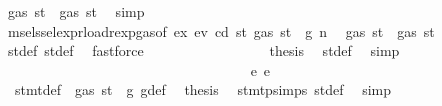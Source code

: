 \begin{isabellebody}
\ {\isachardoublequoteopen}gas\ st{}{\isacharprime}{\kern0pt}\ {\isasymle}\ gas\ st{\isacharprime}{\kern0pt}{\isacharprime}{\kern0pt}{\isachardoublequoteclose}\ \isamarkupfalse%
\ simp\isanewline
\ \ \ \ \ \ \ \ \ \ \ \ \ \ \isamarkupfalse%
\ \isamarkupfalse%
\ msel{\isacharunderscore}{\kern0pt}ssel{\isacharunderscore}{\kern0pt}expr{\isacharunderscore}{\kern0pt}load{\isacharunderscore}{\kern0pt}rexp{\isacharunderscore}{\kern0pt}gas{\isacharparenleft}{\kern0pt}{}{\isacharparenright}{\kern0pt}{\isacharbrackleft}{\kern0pt}of\ ex{\isacharprime}{\kern0pt}\ e\isactrlsub v\ cd\ st{\isacharprime}{\kern0pt}\ {\isachardoublequoteopen}gas\ st\ {\isacharminus}{\kern0pt}\ g{\isachardoublequoteclose}{\isacharbrackright}{\kern0pt}\ n\ \isamarkupfalse%
\ {\isachardoublequoteopen}gas\ st{\isacharprime}{\kern0pt}{\isacharprime}{\kern0pt}\ {\isasymle}\ gas\ st{\isacharprime}{\kern0pt}{\isachardoublequoteclose}\ \isamarkupfalse%
\ st{\isacharprime}{\kern0pt}{\isacharunderscore}{\kern0pt}def\ st{\isacharprime}{\kern0pt}{\isacharprime}{\kern0pt}{\isacharunderscore}{\kern0pt}def\ \isamarkupfalse%
\ fastforce\isanewline
\ \ \ \ \ \ \ \ \ \ \ \ \ \ \isamarkupfalse%
\ \isamarkupfalse%
\ {\isacharquery}{\kern0pt}thesis\ \isamarkupfalse%
\ st{\isacharprime}{\kern0pt}{\isacharunderscore}{\kern0pt}def\ \isamarkupfalse%
\ simp\isanewline
\ \ \ \ \ \ \ \ \ \ \ \ \isamarkupfalse%
\isanewline
\ \ \ \ \ \ \ \ \ \ \isamarkupfalse%
\isanewline
\ \ \ \ \ \ \ \ \isamarkupfalse%
\isanewline
\ \ \ \ \ \ \isamarkupfalse%
\isanewline
\ \ \ \ \ \ \ \ \isamarkupfalse%
\ {\isacharparenleft}{\kern0pt}e\ e{\isacharparenright}{\kern0pt}\isanewline
\ \ \ \ \ \ \ \ \isamarkupfalse%
\ {}{}\ stmt{\isacharunderscore}{\kern0pt}def\ {\isacharbackquoteopen}{\isasymnot}\ gas\ st\ {\isasymle}\ g{\isacharbackquoteclose}\ g{\isacharunderscore}{\kern0pt}def\ \isamarkupfalse%
\ {\isacharquery}{\kern0pt}thesis\ \isamarkupfalse%
\ stmt{\isachardot}{\kern0pt}psimps{\isacharparenleft}{\kern0pt}{}{}{\isacharparenright}{\kern0pt}\ st{\isacharprime}{\kern0pt}{\isacharunderscore}{\kern0pt}def\ \isamarkupfalse%
\ simp\isanewline
\ \ \ \ \ \ \isamarkupfalse%
\isanewline
\ \ \ \ \isamarkupfalse%
\isanewline

\end{isabellebody}
